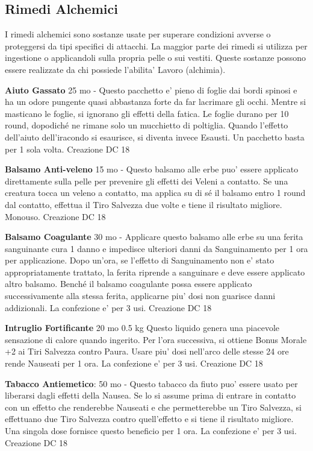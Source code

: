 \documentclass[a4paper,11pt,twoside,openany]{book}
\begin{document}
{\subsection{Rimedi Alchemici}

\label{rimedi-alchemici}

I rimedi alchemici sono sostanze usate per superare condizioni avverse o proteggersi da tipi specifici di attacchi. La maggior parte dei rimedi si utilizza per ingestione o applicandoli sulla propria pelle o sui vestiti. Queste sostanze possono essere realizzate da chi possiede l'abilita' Lavoro (alchimia).

\textbf{Aiuto Gassato} 25 mo - Questo pacchetto e' pieno di foglie dai bordi spinosi e ha un odore pungente quasi abbastanza forte da far lacrimare gli occhi. Mentre si masticano le foglie, si ignorano gli effetti della fatica. Le foglie durano per 10 round, dopodiché ne rimane solo un mucchietto di poltiglia. Quando l'effetto dell'aiuto dell'iracondo si esaurisce, si diventa invece Esausti. Un pacchetto basta per 1 sola volta. Creazione DC 18

\textbf{Balsamo Anti-veleno} 15 mo - Questo balsamo alle erbe puo' essere applicato direttamente sulla pelle per prevenire gli effetti dei Veleni a contatto. Se una creatura tocca un veleno a contatto, ma applica su di sé il balsamo entro 1 round dal contatto, effettua il Tiro Salvezza due volte e tiene il risultato migliore. Monouso. Creazione DC 18

\textbf{Balsamo Coagulante} 30 mo - Applicare questo balsamo alle erbe su una ferita sanguinante cura 1 danno e impedisce ulteriori danni da Sanguinamento per 1 ora per applicazione. Dopo un'ora, se l'effetto di Sanguinamento non e' stato appropriatamente trattato, la ferita riprende a sanguinare e deve essere applicato altro balsamo. Benché il balsamo coagulante possa essere applicato successivamente alla stessa ferita, applicarne piu' dosi non guarisce danni addizionali. La confezione e' per 3 usi. Creazione DC 18

\textbf{Intruglio Fortificante} 20 mo 0.5 kg Questo liquido genera una piacevole sensazione di calore quando ingerito. Per l'ora successiva, si ottiene Bonus Morale +2 ai Tiri Salvezza contro Paura. Usare piu' dosi nell'arco delle stesse 24 ore rende Nauseati per 1 ora. La confezione e' per 3 usi. Creazione DC 18

\textbf{Tabacco Antiemetico}: 50 mo - Questo tabacco da fiuto puo' essere usato per liberarsi dagli effetti della Nausea. Se lo si assume prima di entrare in contatto con un effetto che renderebbe Nauseati e che permetterebbe un Tiro Salvezza, si effettuano due Tiro Salvezza contro quell'effetto e si tiene il risultato migliore. Una singola dose fornisce questo beneficio per 1 ora. La confezione e’ per 3 usi. Creazione DC 18

}
\end{document}
